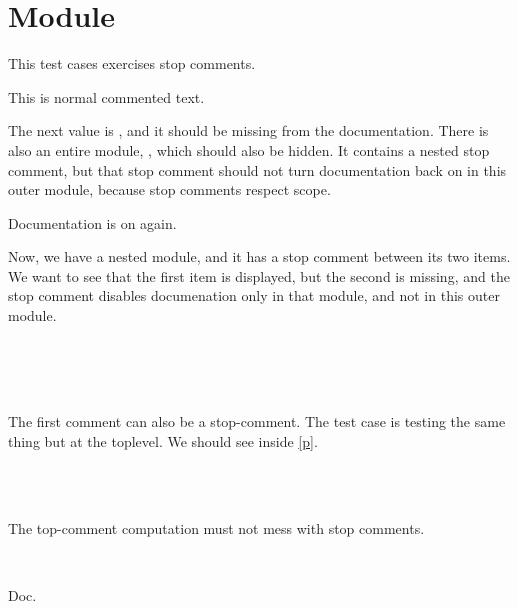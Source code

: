 \section{Module }\label{Stop}%
This test cases exercises stop comments.

\label{Stop--val-foo}\begin{ocamlindent}This is normal commented text.\end{ocamlindent}%
\medbreak
The next value is , and it should be missing from the documentation. There is also an entire module, , which should also be hidden. It contains a nested stop comment, but that stop comment should not turn documentation back on in this outer module, because stop comments respect scope.

Documentation is on again.

Now, we have a nested module, and it has a stop comment between its two items. We want to see that the first item is displayed, but the second is missing, and the stop comment disables documenation only in that module, and not in this outer module.

\label{Stop--module-N}\begin{ocamlindent}\label{Stop-N--val-quux}\\
\end{ocamlindent}%
\\
\label{Stop--val-lol}\\
The first comment can also be a stop-comment. The test case  is testing the same thing but at the toplevel. We should see  inside \hyperref[Stop-O]{[p\pageref*{Stop-O}]}.

\label{Stop--module-O}\begin{ocamlindent}\label{Stop-O--val-bar}\\
\end{ocamlindent}%
\\
The top-comment computation must not mess with stop comments.

\label{Stop--module-P}\begin{ocamlindent}\label{Stop-P--val-bar}\\
\end{ocamlindent}%
\begin{ocamlindent}Doc.\end{ocamlindent}%
\medbreak


